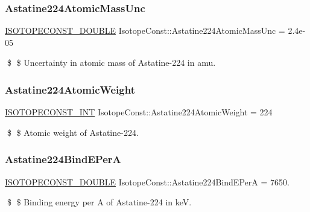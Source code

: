 \subsubsection{\texorpdfstring{Astatine224\+Atomic\+Mass\+Unc}{Astatine224AtomicMassUnc}}
{\footnotesize\ttfamily \mbox{\hyperlink{group___isotope_const-_macros_ga8f45a7272ce02c0b4c65c44636ed719a}{I\+S\+O\+T\+O\+P\+E\+C\+O\+N\+S\+T\+\_\+\+D\+O\+U\+B\+LE}} Isotope\+Const\+::\+Astatine224\+Atomic\+Mass\+Unc = 2.\+4e-\/05}

\$ \$ Uncertainty in atomic mass of Astatine-\/224 in amu. \mbox{\label{group___isotope_const-_astatine-_at224_ga9b63b09fdfa406f96b96138b6e7f90fa}} 
\subsubsection{\texorpdfstring{Astatine224\+Atomic\+Weight}{Astatine224AtomicWeight}}
{\footnotesize\ttfamily \mbox{\hyperlink{group___isotope_const-_macros_ga5f18360b3e99483a35c32d789e62621c}{I\+S\+O\+T\+O\+P\+E\+C\+O\+N\+S\+T\+\_\+\+I\+NT}} Isotope\+Const\+::\+Astatine224\+Atomic\+Weight = 224}

\$ \$ Atomic weight of Astatine-\/224. \mbox{\label{group___isotope_const-_astatine-_at224_ga32635e78cefebc0f103b22a924719570}} 
\subsubsection{\texorpdfstring{Astatine224\+Bind\+E\+PerA}{Astatine224BindEPerA}}
{\footnotesize\ttfamily \mbox{\hyperlink{group___isotope_const-_macros_ga8f45a7272ce02c0b4c65c44636ed719a}{I\+S\+O\+T\+O\+P\+E\+C\+O\+N\+S\+T\+\_\+\+D\+O\+U\+B\+LE}} Isotope\+Const\+::\+Astatine224\+Bind\+E\+PerA = 7650.}

\$ \$ Binding energy per A of Astatine-\/224 in keV. \mbox{\label{group___isotope_const-_astatine-_at224_ga75f6d8175555b05b911b687ab66ae717}} 
